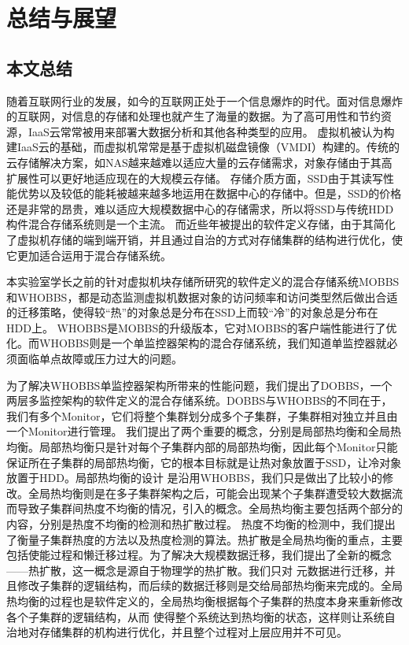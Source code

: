 
\chapter{总结与展望}
\label{chap:summary}
\section{本文总结}
随着互联网行业的发展，如今的互联网正处于一个信息爆炸的时代。面对信息爆炸的互联网，对信息的存储和处理也就产生了海量的数据。为了高可用性和节约资源，IaaS云常常被用来部署大数据分析和其他各种类型的应用。
虚拟机被认为构建IaaS云的基础，而虚拟机常常是基于虚拟机磁盘镜像（VMDI）构建的。传统的云存储解决方案，如NAS越来越难以适应大量的云存储需求，对象存储由于其高扩展性可以更好地适应现在的大规模云存储。
存储介质方面，SSD由于其读写性能优势以及较低的能耗被越来越多地运用在数据中心的存储中。但是，SSD的价格还是非常的昂贵，难以适应大规模数据中心的存储需求，所以将SSD与传统HDD构件混合存储系统则是一个主流。
而近些年被提出的软件定义存储，由于其简化了虚拟机存储的端到端开销，并且通过自治的方式对存储集群的结构进行优化，使它更加适合运用于混合存储系统。

本实验室学长之前的针对虚拟机块存储所研究的软件定义的混合存储系统MOBBS和WHOBBS，都是动态监测虚拟机数据对象的访问频率和访问类型然后做出合适的迁移策略，使得较“热”的对象总是分布在SSD上而较“冷”的对象总是分布在HDD上。
WHOBBS是MOBBS的升级版本，它对MOBBS的客户端性能进行了优化。而WHOBBS则是一个单监控器架构的混合存储系统，我们知道单监控器就必须面临单点故障或压力过大的问题。

为了解决WHOBBS单监控器架构所带来的性能问题，我们提出了DOBBS，一个两层多监控架构的软件定义的混合存储系统。DOBBS与WHOBBS的不同在于，我们有多个Monitor，它们将整个集群划分成多个子集群，子集群相对独立并且由一个Monitor进行管理。
我们提出了两个重要的概念，分别是局部热均衡和全局热均衡。局部热均衡只是针对每个子集群内部的局部热均衡，因此每个Monitor只能保证所在子集群的局部热均衡，它的根本目标就是让热对象放置于SSD，让冷对象放置于HDD。局部热均衡的设计
是沿用WHOBBS，我们只是做出了比较小的修改。全局热均衡则是在多子集群架构之后，可能会出现某个子集群遭受较大数据流而导致子集群间热度不均衡的情况，引入的概念。全局热均衡主要包括两个部分的内容，分别是热度不均衡的检测和热扩散过程。
热度不均衡的检测中，我们提出了衡量子集群热度的方法以及热度检测的算法。热扩散是全局热均衡的重点，主要包括使能过程和懒迁移过程。为了解决大规模数据迁移，我们提出了全新的概念——热扩散，这一概念是源自于物理学的热扩散。我们只对
元数据进行迁移，并且修改子集群的逻辑结构，而后续的数据迁移则是交给局部热均衡来完成的。全局热均衡的过程也是软件定义的，全局热均衡根据每个子集群的热度本身来重新修改各个子集群的逻辑结构，从而
使得整个系统达到热均衡的状态，这样则让系统自治地对存储集群的机构进行优化，并且整个过程对上层应用并不可见。

